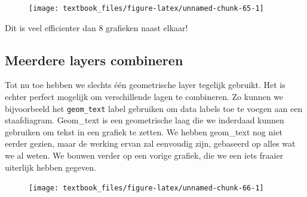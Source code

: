 \documentclass[]{tufte-book}
\newenvironment{Shaded}{}{}
\newcommand{\DataTypeTok}[1]{\textcolor[rgb]{0.56,0.13,0.00}{#1}}
\newcommand{\DecValTok}[1]{\textcolor[rgb]{0.25,0.63,0.44}{#1}}
\newcommand{\KeywordTok}[1]{\textcolor[rgb]{0.00,0.44,0.13}{\textbf{#1}}}
\newcommand{\NormalTok}[1]{#1}
\newcommand{\OperatorTok}[1]{\textcolor[rgb]{0.40,0.40,0.40}{#1}}
\newcommand{\StringTok}[1]{\textcolor[rgb]{0.25,0.44,0.63}{#1}}
\begin{document}
\begin{figure}
\texttt{[image: textbook\_files/figure-latex/unnamed-chunk-65-1]} \end{figure}

Dit is veel efficienter dan 8 grafieken naast elkaar!

\hypertarget{meerdere-layers-combineren}{%
\subsection{Meerdere layers combineren}\label{meerdere-layers-combineren}}

Tot nu toe hebben we slechts één geometrische layer tegelijk gebruikt. Het is echter perfect mogelijk om verschillende lagen te combineren. Zo kunnen we bijvoorbeeld het \texttt{geom\_text} label gebruiken om data labels toe te voegen aan een staafdiagram. Geom\_text is een geometrische laag die we inderdaad kunnen gebruiken om tekst in een grafiek te zetten. We hebben geom\_text nog niet eerder gezien, maar de werking ervan zal eenvoudig zijn, gebaseerd op alles wat we al weten. We bouwen verder op een vorige grafiek, die we een iets fraaier uiterlijk hebben gegeven.

\begin{Shaded}
\end{Shaded}

\begin{figure}
\texttt{[image: textbook\_files/figure-latex/unnamed-chunk-66-1]} \end{figure}
\end{document}
